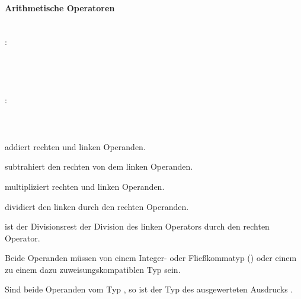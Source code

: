 \paragraph{Arithmetische Operatoren}\label{Arithmetische Operatoren}
~\\
:\label{asdr_mult}\\
\hspace*{1cm} \\
\hspace*{1cm} \glq\Gt{*}\grq  {} \\
\hspace*{1cm} \glq\Gt{/}\grq  {} \\
\hspace*{1cm} \glq\Gt{\%}\grq  {} \\
:\label{asdr_add}\\
\hspace*{1cm} \\
\hspace*{1cm} \glq\Gt{+}\grq  {} \\
\hspace*{1cm} \glq\Gt{-}\grq  {} \\

\op{\plus} addiert rechten und linken Operanden.

\op{-} subtrahiert den rechten von dem linken Operanden.

\op{*} multipliziert rechten und linken Operanden.

\op{/} dividiert den linken durch den rechten Operanden.

\op{\%} ist der Divisionsrest der Division des linken Operators durch den rechten Operator.

Beide Operanden müssen von einem Integer- oder Fließkommatyp () oder einem
zu einem dazu zuweisungskompatiblen Typ sein.

Sind beide Operanden vom Typ , so ist der Typ des ausgewerteten Ausdrucks .

